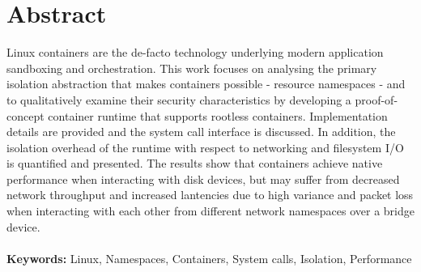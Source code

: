 \chapter*{Abstract}
Linux containers are the de-facto technology underlying 
modern application sandboxing and orchestration. This work focuses 
on analysing the primary isolation abstraction that makes 
containers possible - resource namespaces - and to qualitatively examine their security characteristics
by developing a proof-of-concept container runtime that supports rootless containers. 
Implementation details are provided and the system call interface is discussed.
In addition, the isolation overhead 
of the runtime with respect to networking and filesystem I/O is quantified and presented.
The results show that containers achieve native performance when interacting with 
disk devices, but may suffer from decreased network throughput and increased lantencies due to high variance 
and packet loss when interacting with each other from different network namespaces over a bridge device.
\\
\\
\textbf{Keywords:} Linux, Namespaces, Containers, System calls, Isolation, Performance
